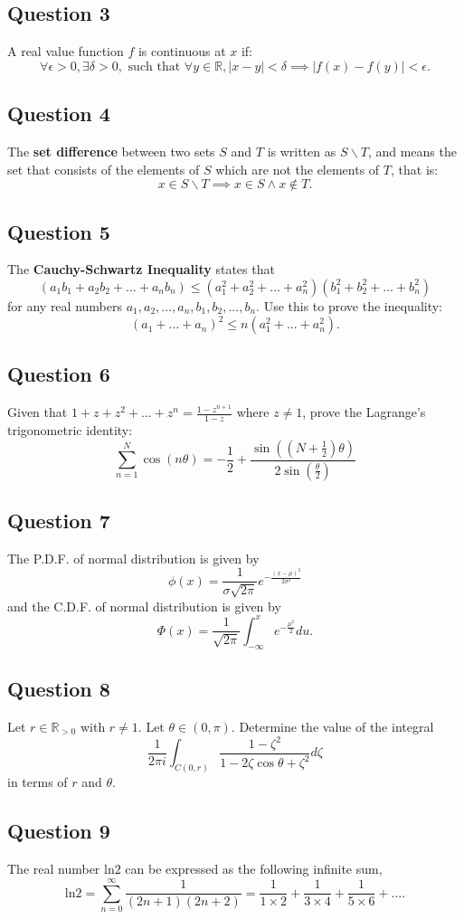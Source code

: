 \documentclass[12pt]{article}
\begin{document}
\subsection{Question 3}
A real value function $f$ is continuous at $x$ if: $$\forall \epsilon >0, \exists\delta >0, \text{ such that }\forall y\in \mathbb{R}, |x-y|<\delta\implies|f(x)-f(y)|<\epsilon.$$
\subsection{Question 4}
The \textbf{set difference} between two sets $S$ and $T$ is written as $S\backslash T$, and means the set that consists of the elements of $S$ which are not the elements of $T$, that is: $$x\in S\backslash T\implies x\in S\wedge x\notin T.$$
\subsection{Question 5}
The \textbf{Cauchy-Schwartz Inequality} states that \[(a_1b_1+a_2b_2+...+a_nb_n)\leq (a_1^2+a_2^2+...+a_n^2)(b_1^2+b_2^2+...+b_n^2)\] for any real numbers $a_1, a_2, ..., a_n, b_1, b_2, ..., b_n$. Use this to prove the inequality: $$(a_1+...+a_n)^2\leq n(a_1^2+...+a_n^2).$$
\subsection{Question 6}
Given that $1+z+z^2+...+z^n=\frac{1-z^{n+1}}{1-z}$ where $z\neq 1$, prove the Lagrange's trigonometric identity: \[\sum_{n=1}^N\cos(n\theta)=-\frac{1}{2}+\frac{\sin((N+\frac{1}{2})\theta)}{2\sin(\frac{\theta}{2})}\]
\subsection{Question 7}
The P.D.F. of normal distribution is given by $$\phi(x)=\frac{1}{\sigma\sqrt{2\pi}}e^{-\frac{(x-\mu)^2}{2\sigma^2}}$$ and the C.D.F. of normal distribution is given by $$\Phi(x)=\frac{1}{\sqrt{2\pi}}\int_{-\infty}^xe^{-\frac{\mu^2}{2}}du.$$
\subsection{Question 8}
Let $r\in\mathbb{R}_{>0}$ with $r\neq 1$. Let $\theta\in(0,\pi)$. Determine the value of the integral $$\frac{1}{2\pi i}\int_{C(0,r)}\frac{1-\zeta^2}{1-2\zeta\cos\theta+\zeta^2}d\zeta$$in terms of $r$ and $\theta$.
\subsection{Question 9}
The real number ln$2$ can be expressed as the following infinite sum, $$\text{ln}2=\sum_{n=0}^\infty\frac{1}{(2n+1)(2n+2)}=\frac{1}{1\times2}+\frac{1}{3\times4}+\frac{1}{5\times6}+\dots.$$
\end{document}
